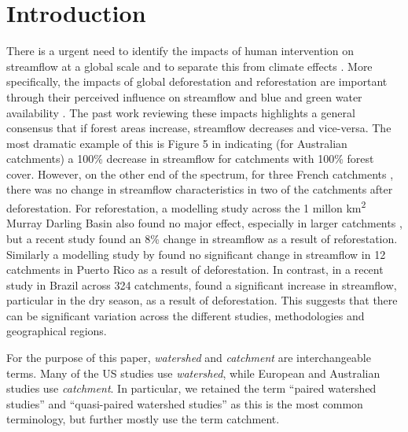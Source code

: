 \documentclass[]{elsarticle} %
\begin{document}
\hypertarget{introduction}{%
\section{Introduction}\label{introduction}}

There is a urgent need to identify the impacts of human intervention on streamflow at a global scale and to separate this from climate effects \citep{wang2020, hoekvandijke2022}. More specifically, the impacts of global deforestation and reforestation are important through their perceived influence on streamflow and blue and green water availability \citep{hoekvandijke2022, schyns2019}. The past work reviewing these impacts \citep{andreassian2004, jackson2005, zhang2017, brown2005, brown2013, filoso2017} highlights a general consensus that if forest areas increase, streamflow decreases and vice-versa. The most dramatic example of this is Figure 5 in \citet{zhang2011} indicating (for Australian catchments) a 100\% decrease in streamflow for catchments with 100\% forest cover. However, on the other end of the spectrum, for three French catchments \citep{cosandey2005}, there was no change in streamflow characteristics in two of the catchments after deforestation. For reforestation, a modelling study across the 1 millon km\textsuperscript{2} Murray Darling Basin also found no major effect, especially in larger catchments \citep{vandijk2007}, but a recent study \citep{hoekvandijke2022} found an 8\% change in streamflow as a result of reforestation. Similarly a modelling study by \citet{beck2013} found no significant change in streamflow in 12 catchments in Puerto Rico as a result of deforestation. In contrast, in a recent study in Brazil across 324 catchments, \citet{levy2018} found a significant increase in streamflow, particular in the dry season, as a result of deforestation. This suggests that there can be significant variation across the different studies, methodologies and geographical regions.

For the purpose of this paper, \emph{watershed} and \emph{catchment} are interchangeable terms. Many of the US studies use \emph{watershed}, while European and Australian studies use \emph{catchment}. In particular, we retained the term ``paired watershed studies'' and ``quasi-paired watershed studies'' as this is the most common terminology, but further mostly use the term catchment.
\end{document}
